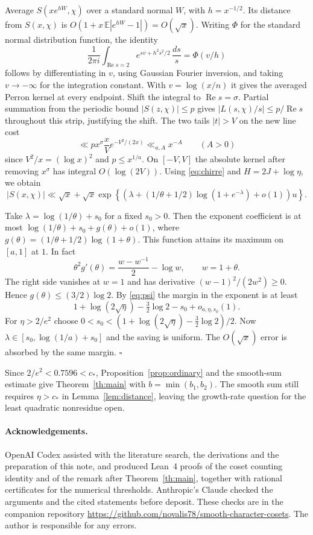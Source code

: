 \documentclass[11pt]{article}
\newcommand{\cstar}{c_*}
\newcommand{\re}{\operatorname{Re}}
\begin{document}
Average \(S(xe^{hW},\chi)\) over a standard normal \(W\), with
\(h=x^{-1/2}\). Its distance from \(S(x,\chi)\) is
\(O(1+x\,\mathbb E|e^{hW}-1|)=O(\sqrt x)\).
Writing \(\Phi\) for the standard normal distribution function, the identity
\[
 \frac{1}{2\pi i}\int_{\re s=2} e^{sv+h^2s^2/2}\,\frac{ds}{s}
 =\Phi(v/h)
\]
follows by differentiating in \(v\), using Gaussian Fourier inversion,
and taking \(v\to-\infty\) for the integration constant. With
\(v=\log(x/n)\) it gives the averaged Perron kernel at every endpoint.
Shift the integral to \(\re s=\sigma\). Partial summation from the
periodic bound \(|S(z,\chi)|\le p\) gives
\(|L(s,\chi)/s|\le p/\re s\) throughout this strip, justifying the
shift. The two tails \(|t|>V\) on the new line cost
\[
 \ll p x^\sigma \frac{x}{V}e^{-V^2/(2x)}
 \ll_{a,A}x^{-A}\qquad(A>0)
\]
since \(V^2/x=(\log x)^2\) and \(p\le x^{1/a}\). On \([-V,V]\) the
absolute kernel after removing \(x^\sigma\) has integral \(O(\log(2V))\).
Using \eqref{eq:chirre} and \(H=2J+\log\eta\), we obtain
\[
 |S(x,\chi)|\ll\sqrt x+
 \sqrt x\exp\!\left\{\left(
 \lambda+(1/\theta+1/2)\log(1+e^{-\lambda})+o(1)\right)u\right\}.
\]

Take \(\lambda=\log(1/\theta)+s_0\) for a fixed \(s_0>0\).
Then the exponent coefficient is at most
\(\log(1/\theta)+s_0+g(\theta)+o(1)\), where
\(g(\theta)=(1/\theta+1/2)\log(1+\theta)\).
This function attains its maximum on \([a,1]\) at \(1\). In fact
\[
 \theta^2 g'(\theta)=\frac{w-w^{-1}}2-\log w,\qquad w=1+\theta .
\]
The right side vanishes at \(w=1\) and has derivative
\((w-1)^2/(2w^2)\ge0\). Hence \(g(\theta)\le(3/2)\log2\).
By \eqref{eq:psi} the margin in the exponent is at least
\[
 1+\log(2\sqrt\eta)-\tfrac32\log2-s_0+o_{a,\eta,s_0}(1).
\]
For \(\eta>2/e^2\) choose \(0<s_0<
(1+\log(2\sqrt\eta)-\tfrac32\log2)/2\).
Now \(\lambda\in[s_0,\log(1/a)+s_0]\) and the saving is uniform.
The \(O(\sqrt x)\) error is absorbed by the same margin. \hfill\(\square\)

Since \(2/e^2<0.7596<\cstar\), Proposition~\ref{prop:ordinary} and
the smooth-sum estimate give Theorem~\ref{th:main} with
\(b=\min(b_1,b_2)\). The smooth sum still requires \(\eta>\cstar\)
in Lemma~\ref{lem:distance}, leaving the growth-rate question for the
least quadratic nonresidue open.

\paragraph{Acknowledgements.}
OpenAI Codex assisted with the literature search, the derivations and the
preparation of this note, and produced Lean~4 proofs of the coset counting
identity and of the remark after Theorem~\ref{th:main}, together with
rational certificates for the numerical thresholds. Anthropic's Claude
checked the arguments and the cited statements before deposit. These
checks are in the companion repository
\url{https://github.com/novalis78/smooth-character-cosets}.
The author is responsible for any errors.
\end{document}
